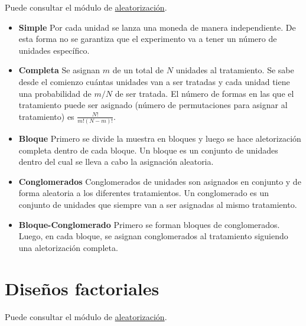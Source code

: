 \documentclass[
  12pt,
  spanish,
]{book}
\providecommand{\tightlist}{%
  \setlength{\itemsep}{0pt}\setlength{\parskip}{0pt}}
\begin{document}
Puede consultar el módulo de \href{aleatorización.html}{aleatorización}.

\begin{itemize}
\tightlist
\item
  \textbf{Simple} Por cada unidad se lanza una moneda de manera independiente. De esta forma no se garantiza que el experimento va a tener un número de unidades específico.
\item
  \textbf{Completa} Se asignan \(m\) de un total de \(N\) unidades al tratamiento. Se sabe desde el comienzo cuántas unidades van a ser tratadas y cada unidad tiene una probabilidad de \(m/N\) de ser tratada. El número de formas en las que el tratamiento puede ser asignado
  (número de permutaciones para asignar al tratamiento) es \(\frac{N!}{m!(N-m)!}\).
\item
  \textbf{Bloque} Primero se divide la muestra en bloques y luego se hace aletorización completa dentro de cada bloque. Un bloque es un conjunto de unidades dentro del cual se lleva a cabo la asignación aleatoria.
\item
  \textbf{Conglomerados} Conglomerados de unidades son asignados en conjunto y de forma aleatoria a los diferentes tratamientos. Un conglomerado es un conjunto de unidades que siempre van a ser asignadas al mismo tratamiento.
\item
  \textbf{Bloque-Conglomerado} Primero se forman bloques de conglomerados. Luego, en cada bloque, se asignan conglomerados al tratamiento siguiendo una aletorización completa.
\end{itemize}

\hypertarget{diseuxf1os-factoriales}{%
\section{Diseños factoriales}\label{diseuxf1os-factoriales}}

Puede consultar el módulo de \href{aleatorización.html}{aleatorización}.
\end{document}
